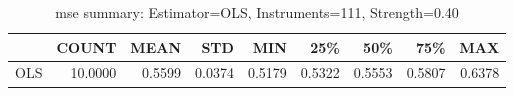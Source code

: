 \begin{table}[ht]
\centering
\caption{mse summary: Estimator=OLS, Instruments=111, Strength=0.40}
\begin{tabular}{lrrrrrrrr}
\toprule
 & COUNT & MEAN & STD & MIN & 25\% & 50\% & 75\% & MAX \\
\midrule
OLS & 10.0000 & 0.5599 & 0.0374 & 0.5179 & 0.5322 & 0.5553 & 0.5807 & 0.6378 \\
\bottomrule
\end{tabular}
\end{table}
